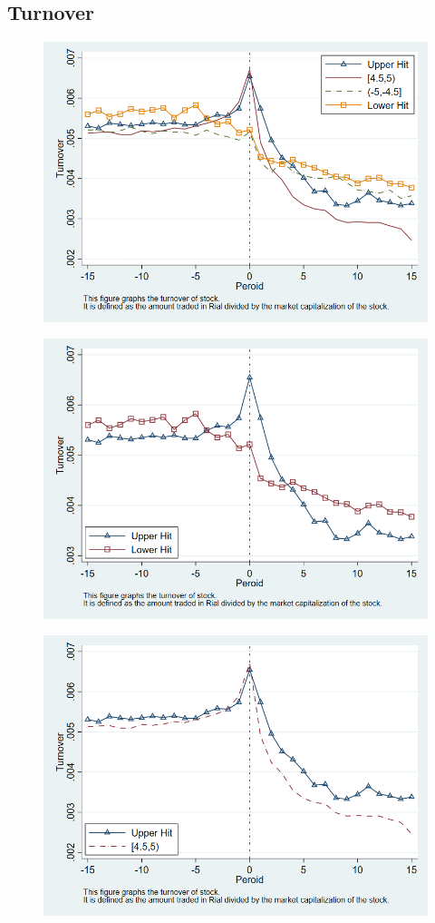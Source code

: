 \documentclass[12pt]{article}
\begin{document}
\subsection{Turnover}

\begin{figure}[htbp]
\centering
\includegraphics[width=0.7\linewidth]{TT}
\caption{}
\label{fig:tt}
\end{figure}

\begin{figure}[htbp]
\centering
\includegraphics[width=0.7\linewidth]{T}
\caption{}
\label{fig:t}
\end{figure}

\begin{figure}[htbp]
\centering
\includegraphics[width=0.7\linewidth]{CUT}
\caption{}
\label{fig:cut}
\end{figure}
\end{document}
